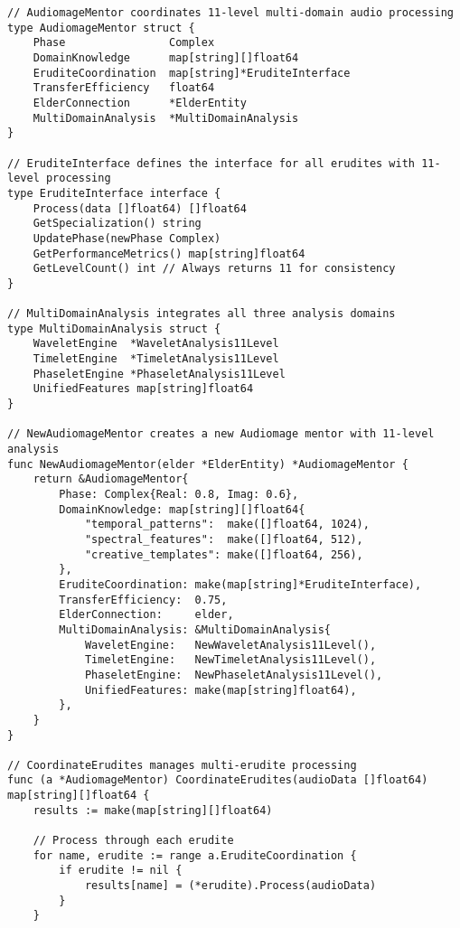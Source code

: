 \begin{tcolorbox}[colback=CodeBackground, colframe=DarkGray, title=Audiomage Mentor Implementation, fonttitle=\bfseries]
\begin{verbatim}
// AudiomageMentor coordinates 11-level multi-domain audio processing
type AudiomageMentor struct {
    Phase                Complex
    DomainKnowledge      map[string][]float64
    EruditeCoordination  map[string]*EruditeInterface
    TransferEfficiency   float64
    ElderConnection      *ElderEntity
    MultiDomainAnalysis  *MultiDomainAnalysis
}

// EruditeInterface defines the interface for all erudites with 11-level processing
type EruditeInterface interface {
    Process(data []float64) []float64
    GetSpecialization() string
    UpdatePhase(newPhase Complex)
    GetPerformanceMetrics() map[string]float64
    GetLevelCount() int // Always returns 11 for consistency
}

// MultiDomainAnalysis integrates all three analysis domains
type MultiDomainAnalysis struct {
    WaveletEngine  *WaveletAnalysis11Level
    TimeletEngine  *TimeletAnalysis11Level  
    PhaseletEngine *PhaseletAnalysis11Level
    UnifiedFeatures map[string]float64
}

// NewAudiomageMentor creates a new Audiomage mentor with 11-level analysis
func NewAudiomageMentor(elder *ElderEntity) *AudiomageMentor {
    return &AudiomageMentor{
        Phase: Complex{Real: 0.8, Imag: 0.6},
        DomainKnowledge: map[string][]float64{
            "temporal_patterns":  make([]float64, 1024),
            "spectral_features":  make([]float64, 512),
            "creative_templates": make([]float64, 256),
        },
        EruditeCoordination: make(map[string]*EruditeInterface),
        TransferEfficiency:  0.75,
        ElderConnection:     elder,
        MultiDomainAnalysis: &MultiDomainAnalysis{
            WaveletEngine:   NewWaveletAnalysis11Level(),
            TimeletEngine:   NewTimeletAnalysis11Level(),
            PhaseletEngine:  NewPhaseletAnalysis11Level(),
            UnifiedFeatures: make(map[string]float64),
        },
    }
}

// CoordinateErudites manages multi-erudite processing
func (a *AudiomageMentor) CoordinateErudites(audioData []float64) map[string][]float64 {
    results := make(map[string][]float64)
    
    // Process through each erudite
    for name, erudite := range a.EruditeCoordination {
        if erudite != nil {
            results[name] = (*erudite).Process(audioData)
        }
    }
    

\end{verbatim}
\end{tcolorbox}

